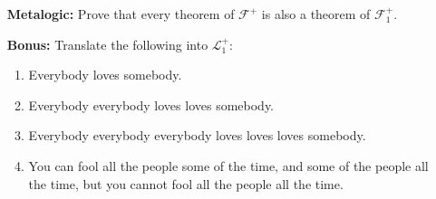 \documentclass[a4paper, 11pt]{article} %
\begin{document}
\begin{enumerate}[leftmargin=1.2in,labelsep=.15in]
\item[\bf Metalogic:] Prove that every theorem of $\mathcal{F}^+$ is also a theorem of $\mathcal{F}^+_1$.
\item[\bf Bonus:] Translate the following into $\mathcal{L}_1^+$:
	\begin{enumerate}[label=(\arabic*)]\small
	\item Everybody loves somebody.
	\item Everybody everybody loves loves somebody.
	\item Everybody everybody everybody loves loves loves somebody.
	\item You can fool all the people some of the time, and some of the people all the time, but you cannot fool all the people all the time.
	\end{enumerate}
\end{enumerate}
\end{document}
